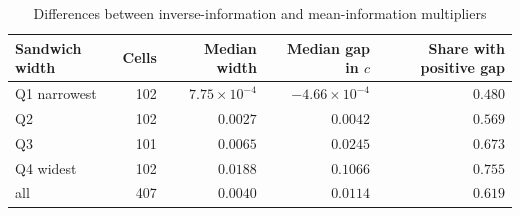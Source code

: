 \begin{table}[htbp]\centering
\caption{Differences between inverse-information and mean-information multipliers}
\label{tab:jensen-gap}
{\small\begin{tabular}{lrrrr}
\toprule
Sandwich width & Cells & Median width & Median gap in $c$ & Share with positive gap \\
\midrule
Q1 narrowest & 102 & $7.75\times 10^{-4}$ & $-4.66\times 10^{-4}$ & $0.480$ \\
Q2 & 102 & $0.0027$ & $0.0042$ & $0.569$ \\
Q3 & 101 & $0.0065$ & $0.0245$ & $0.673$ \\
Q4 widest & 102 & $0.0188$ & $0.1066$ & $0.755$ \\
all & 407 & $0.0040$ & $0.0114$ & $0.619$ \\
\bottomrule
\end{tabular}}
\end{table}
